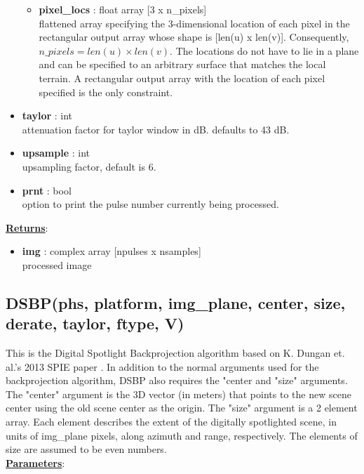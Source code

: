 \documentclass{article}
\newcommand{\defs}[2]{\textbf{{#1}} : {#2}}
\begin{document}
\begin{itemize}
\begin{itemize}
	    \item \defs{pixel\_locs}{float array [3 x n\_pixels]}\\
	    	flattened array specifying the 3-dimensional location of each pixel in the rectangular output array whose shape is [len(u) x len(v)].  Consequently, $n\_pixels = len(u) \times len(v)$.  The locations do not have to lie in a plane and can be specified to an arbitrary surface that matches the local terrain.  A rectangular output array with the location of each pixel specified is the only constraint.
	\end{itemize}
	\item\defs{taylor}{int}\\
	attenuation factor for taylor window in dB.  defaults to 43 dB.
	\item\defs{upsample}{int}\\
	upsampling factor, default is 6.
	\item\defs{prnt}{bool}\\
	option to print the pulse number currently being processed.
\end{itemize}

\noindent \underline{\textbf{Returns}}:
\begin{itemize}
	\item \defs{img}{complex array [npulses x nsamples]}\\
	processed image
\end{itemize}

\newpage

\subsection{DSBP(phs, platform, img\_plane, center, size, derate, taylor, ftype, V)}
This is the Digital Spotlight Backprojection algorithm based on K. Dungan et. al.'s 2013 SPIE paper \cite{spotlight}.  In addition to the normal arguments used for the backprojection algorithm, DSBP also requires the "center and "size" arguments.  The "center" argument is the 3D vector (in meters) that points to the new scene center using the old scene center as the origin. The "size" argument is a 2 element array.  Each element describes the  extent of the digitally spotlighted scene, in units of img\_plane pixels, along azimuth and range, respectively.  The elements of size are assumed to be even numbers.\\

\noindent \underline{\textbf{Parameters}}:
\end{document}
